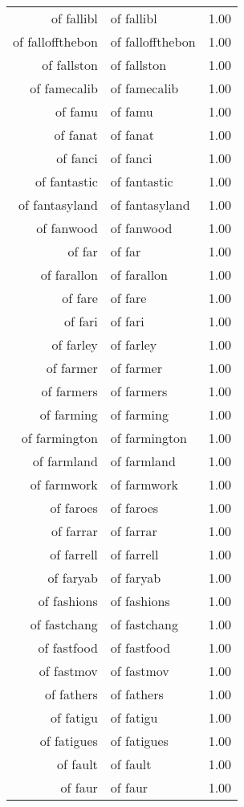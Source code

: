 \begin{table}[ht]
\begin{tabular}{rlr}
  of fallibl & of fallibl & 1.00 \\ 
  of falloffthebon & of falloffthebon & 1.00 \\ 
  of fallston & of fallston & 1.00 \\ 
  of famecalib & of famecalib & 1.00 \\ 
  of famu & of famu & 1.00 \\ 
  of fanat & of fanat & 1.00 \\ 
  of fanci & of fanci & 1.00 \\ 
  of fantastic & of fantastic & 1.00 \\ 
  of fantasyland & of fantasyland & 1.00 \\ 
  of fanwood & of fanwood & 1.00 \\ 
  of far & of far & 1.00 \\ 
  of farallon & of farallon & 1.00 \\ 
  of fare & of fare & 1.00 \\ 
  of fari & of fari & 1.00 \\ 
  of farley & of farley & 1.00 \\ 
  of farmer & of farmer & 1.00 \\ 
  of farmers & of farmers & 1.00 \\ 
  of farming & of farming & 1.00 \\ 
  of farmington & of farmington & 1.00 \\ 
  of farmland & of farmland & 1.00 \\ 
  of farmwork & of farmwork & 1.00 \\ 
  of faroes & of faroes & 1.00 \\ 
  of farrar & of farrar & 1.00 \\ 
  of farrell & of farrell & 1.00 \\ 
  of faryab & of faryab & 1.00 \\ 
  of fashions & of fashions & 1.00 \\ 
  of fastchang & of fastchang & 1.00 \\ 
  of fastfood & of fastfood & 1.00 \\ 
  of fastmov & of fastmov & 1.00 \\ 
  of fathers & of fathers & 1.00 \\ 
  of fatigu & of fatigu & 1.00 \\ 
  of fatigues & of fatigues & 1.00 \\ 
  of fault & of fault & 1.00 \\ 
  of faur & of faur & 1.00 \\ 

\end{tabular}
\end{table}
